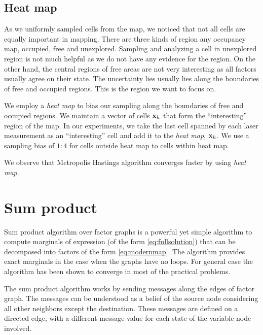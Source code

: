 \documentclass[letterpaper, 10 pt, conference]{ieeeconf} %
\begin{document}
\subsection{Heat map}
As we uniformly sampled cells from the map, we noticed that not all
cells are equally important in mapping. There are three kinds of region any
occupancy map, occupied, free and unexplored. Sampling and analyzing a cell in
unexplored region is not much helpful as we do not have any evidence for the
region. On the other hand, the central regions of free areas are not very
interesting as all factors usually agree on their state. The uncertainty lies
usually lies along the boundaries of free and occupied regions. This is the
region we want to focus on.

We employ a \emph{heat map} to bias our sampling along the boundaries of free and occupied regions. We maintain a vector of cells $\mathbf{x}_h$ that form the ``interesting'' region of the map. In our experiments, we take the last cell spanned by each laser measurement as an ``interesting'' cell and add it to the \emph{heat map}, $\mathbf{x}_h$. We use a sampling bias of $1:4$ for cells outside heat map to cells within heat map.

We observe that Metropolis Hastings algorithm converges faster by using \emph{heat map}.

\section{Sum product}
\newcommand{\msg}[4]{\mu^{#4}_{#1\rightarrow#2}(#3)}
Sum product algorithm over factor graphs \cite{kschischang2001factor} is a
powerful yet simple algorithm to compute marginals  of
expression (of the form \eqref{eq:fullsolution}) that can be decomposed into
factors of the form \eqref{eq:modernmap}. The algorithm provides exact
marginals in the case when the graphs have no loops. For general case the
algorithm has been shown %
to converge in most of the practical problems.
 
The sum product algorithm works by sending messages along the edges of factor
graph. The messages can be understood as a belief of the source node
considering all other neighbors except the destination. These messages are
defined on a directed edge, with a different message value for each state of
the variable node involved. 
\end{document}

